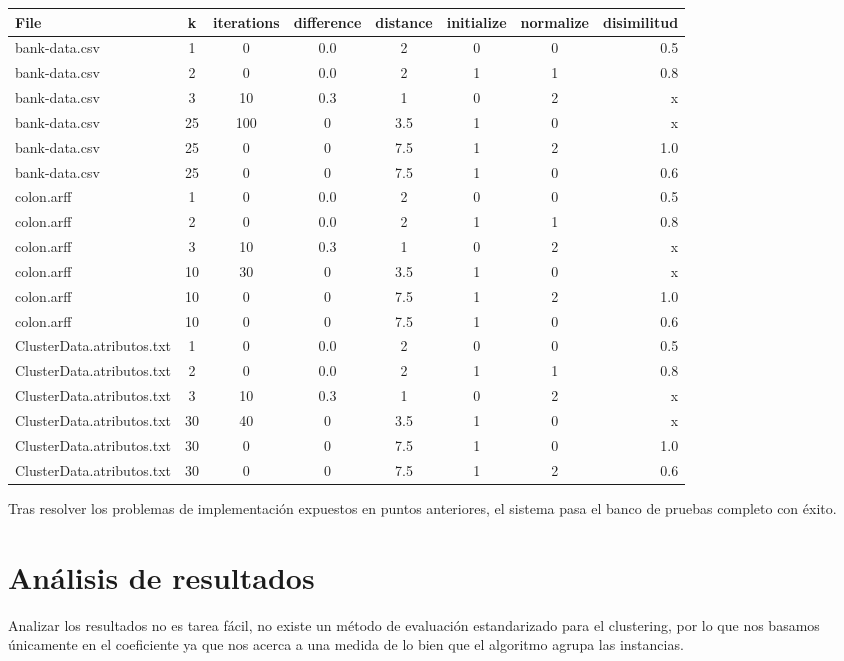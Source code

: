 \documentclass[10pt,a4paper]{article}
\begin{document}
\begin{tabular}[H]{|l|*{6}{c|}r|}
\hline
File              & k & iterations & difference & distance & initialize  & normalize & disimilitud \\
\hline
bank-data.csv	 & 1 & 0 & 0.0 & 2 & 0 & 0 & 0.5	\\
bank-data.csv    & 2 & 0 & 0.0 & 2 & 1 & 1 & 0.8 \\
bank-data.csv    & 3 & 10 & 0.3 & 1 & 0 & 2 & x \\
bank-data.csv    & 25 & 100& 0 & 3.5 & 1 & 0 & x \\
bank-data.csv    & 25 & 0 & 0 & 7.5 & 1 & 2 & 1.0\\
bank-data.csv    & 25 & 0 & 0 & 7.5 & 1 & 0 & 0.6\\
colon.arff	 & 1 & 0 & 0.0 & 2 & 0 & 0 & 0.5	\\
colon.arff    & 2 & 0 & 0.0 & 2 & 1 & 1 & 0.8 \\
colon.arff   & 3 & 10 & 0.3 & 1 & 0 & 2 & x \\
colon.arff    & 10 & 30& 0 & 3.5 & 1 & 0 & x \\
colon.arff    & 10 & 0 & 0 & 7.5 & 1 & 2 & 1.0\\
colon.arff   & 10 & 0 & 0 & 7.5 & 1 & 0 & 0.6\\
ClusterData.atributos.txt    & 1 & 0 & 0.0 & 2 & 0 & 0 & 0.5	\\
ClusterData.atributos.txt    & 2 & 0 & 0.0 & 2 & 1 & 1 & 0.8 \\
ClusterData.atributos.txt     & 3 & 10 & 0.3 & 1 & 0 & 2 & x \\
ClusterData.atributos.txt    & 30 & 40& 0 & 3.5 & 1 & 0 & x \\
ClusterData.atributos.txt    & 30 & 0 & 0 & 7.5 & 1 & 0 & 1.0\\
ClusterData.atributos.txt    & 30 & 0 & 0 & 7.5 & 1 & 2 & 0.6\\
\hline
\end{tabular}

Tras resolver los problemas de implementación expuestos en puntos anteriores, el sistema pasa el banco de pruebas completo con éxito.

\section{Análisis de resultados}

Analizar los resultados no es tarea fácil, no existe un método de evaluación estandarizado para el clustering, por lo que nos basamos únicamente en el coeficiente ya que nos acerca a una medida de lo bien que el algoritmo agrupa las instancias.
\end{document}
